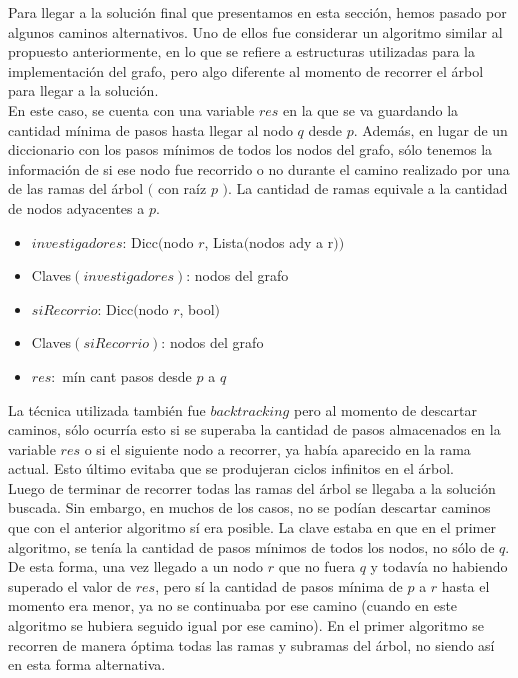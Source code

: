 \documentclass[12pt, a4paper,english,spanish]{article}
\begin{document}
Para llegar a la soluci\'on final que presentamos en esta secci\'on, hemos pasado por algunos caminos alternativos.
Uno de ellos fue considerar un algoritmo similar al propuesto anteriormente, en lo que se refiere a estructuras utilizadas para la implementaci\'on del grafo, pero algo diferente al momento de recorrer el \'arbol para llegar a la soluci\'on. \\
En este caso, se cuenta con una variable $res$ en la que se va guardando la cantidad m\'inima de pasos hasta llegar al nodo $q$ desde $p$. Adem\'as, en lugar de un diccionario con los pasos m\'inimos de todos los nodos del grafo, s\'olo tenemos la informaci\'on de si ese nodo fue recorrido o no durante el camino realizado por una de las ramas del \'arbol $($ con ra\'iz $p$ $)$. La cantidad de ramas equivale a la cantidad de nodos adyacentes a $p$. \\
\begin{itemize}
\item $investigadores$: Dicc$($nodo $r$, Lista$($nodos ady a r$))$
\item Claves$(investigadores)$: nodos del grafo
\item $siRecorrio$: Dicc$($nodo $r$, bool$)$
\item Claves$(siRecorrio)$: nodos del grafo
\item $res:$ m\'in cant pasos desde $p$ a $q$ \\
\end{itemize}
La t\'ecnica utilizada tambi\'en fue $backtracking$ pero al momento de descartar caminos, s\'olo ocurr\'ia esto si se superaba la cantidad de pasos almacenados en la variable $res$ o si el siguiente nodo a recorrer, ya hab\'ia aparecido en la rama actual. Esto \'ultimo evitaba que se produjeran ciclos infinitos en el \'arbol. \\
Luego de terminar de recorrer todas las ramas del \'arbol se llegaba a la soluci\'on buscada. Sin embargo, en muchos de los casos, no se pod\'ian descartar caminos que con el anterior algoritmo s\'i era posible. La clave estaba en que en el primer algoritmo, se ten\'ia la cantidad de pasos m\'inimos de todos los nodos, no s\'olo de $q$. De esta forma, una vez llegado a un nodo $r$ que no fuera $q$ y todav\'ia no habiendo superado el valor de $res$, pero s\'i la cantidad de pasos m\'inima de $p$ a $r$ hasta el momento era menor, ya no se continuaba por ese camino (cuando en este algoritmo se hubiera seguido igual por ese camino). En el primer algoritmo se recorren de manera \'optima todas las ramas y subramas del \'arbol, no siendo as\'i en esta forma alternativa.  \\
\end{document}
